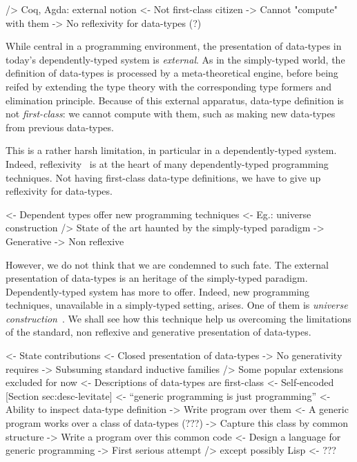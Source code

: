 \documentclass[preprint
              , authoryear
              ]{sigplanconf}
\newenvironment{wstructure}{\comment}{\endcomment}
\begin{document}
\begin{wstructure}
        /> Coq, Agda: external notion
            <- Not first-class citizen
            -> Cannot "compute" with them
            -> No reflexivity for data-types (?)
\end{wstructure}

While central in a programming environment, the presentation of
data-types in today's dependently-typed system is
\emph{external}. As in the simply-typed world, the definition of
data-types is processed by a meta-theoretical engine, before being
reifed by extending the type theory with the corresponding type
formers and elimination principle. Because of this external apparatus,
data-type definition is not \emph{first-class}: we cannot compute with
them, such as making new data-types from previous data-types. 

This is a rather harsh limitation, in particular in a
dependently-typed system. Indeed, reflexivity~\cite{allen:reflection,
  gregoire:ring-solver} is at the heart of many dependently-typed
programming techniques. Not having first-class data-type definitions,
we have to give up reflexivity for data-types.

\begin{wstructure}
    <- Dependent types offer new programming techniques
        <- Eg.: universe construction
        /> State of the art haunted by the simply-typed paradigm
            -> Generative
            -> Non reflexive
\end{wstructure}

However, we do not think that we are condemned to such fate. The
external presentation of data-types is an heritage of the simply-typed
paradigm. Dependently-typed system has more to offer. Indeed, new
programming techniques, unavailable in a simply-typed setting,
arises. One of them is \emph{universe
  construction}~\cite{martin-lof:itt}. We shall see how this technique
help us overcoming the limitations of the standard, non reflexive and
generative presentation of data-types.

\begin{wstructure}
<- State contributions
    <- Closed presentation of data-types 
        -> No generativity requires
        -> Subsuming standard inductive families 
            /> Some popular extensions excluded for now
    <- Descriptions of data-types are first-class 
        <- Self-encoded [Section sec:desc-levitate]
    <- ``generic programming is just programming''
        <- Ability to inspect data-type definition
            -> Write program over them
        <- A generic program works over a class of data-types (???)
            -> Capture this class by common structure
            -> Write a program over this common code
    <- Design a language for generic programming
        -> First serious attempt
            /> except possibly Lisp
                <- ???
\end{wstructure}
\end{document}
